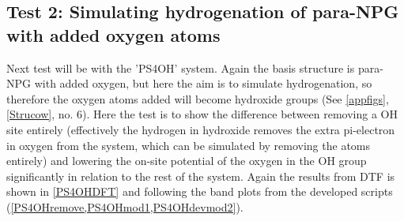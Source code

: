 \subsection{Test 2: Simulating hydrogenation of para-NPG with added oxygen atoms}\label{test2}
Next test will be with the 'PS4OH' system. Again the basis structure is para-NPG with added oxygen, but here the aim is to simulate hydrogenation, so therefore the oxygen atoms added will become hydroxide groups (See \cref{appfigs}, \cref{Strucow}, no. 6). Here the test is to show the difference between removing a OH site entirely (effectively the hydrogen in hydroxide removes the extra pi-electron in oxygen from the system, which can be simulated by removing the atoms entirely) and lowering the on-site potential of the oxygen in the OH group significantly in relation to the rest of the system. Again the results from DTF is shown in \cref{PS4OHDFT} and following the band plots from the developed scripts (\cref{PS4OHremove,PS4OHmod1,PS4OHdevmod2}).
